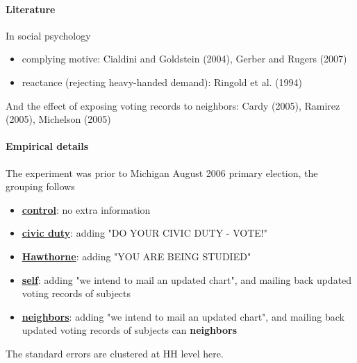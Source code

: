 \documentclass[twoside]{article}
\theoremstyle{definition}
\begin{document}
\paragraph*{Literature} In social psychology
\begin{itemize}
    \item complying motive: Cialdini and Goldstein (2004), Gerber and Rugers (2007)
    \item reactance (rejecting heavy-handed demand): Ringold et al. (1994)
\end{itemize}
And the effect of exposing voting records to neighbors: Cardy (2005), Ramirez (2005), Michelson (2005)

\paragraph*{Empirical details} The experiment was prior to Michigan August 2006 primary election, the grouping follows 
\begin{itemize}
    \item \textbf{\underline{control}}: no extra information
    \item \textbf{\underline{civic duty}}: adding "DO YOUR CIVIC DUTY - VOTE!"
    \item \textbf{\underline{Hawthorne}}: adding "YOU ARE BEING STUDIED"
    \item \textbf{\underline{self}}: adding "we intend to mail an updated chart", and mailing back updated voting records of subjects
    \item \textbf{\underline{neighbors}}: adding "we intend to mail an updated chart", and mailing back updated voting records of subjects can \textbf{neighbors}
\end{itemize}
The standard errors are clustered at HH level here.
\end{document}
